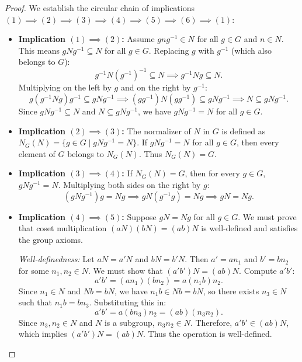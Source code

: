 \begin{proof}
We establish the circular chain of implications $(1) \implies (2) \implies (3) \implies (4) \implies (5) \implies (6) \implies (1)$:
\begin{itemize}[leftmargin=1.5em, itemsep=6pt]
    \item \textbf{Implication $(1) \implies (2)$:}
    Assume $gng^{-1} \in N$ for all $g \in G$ and $n \in N$.
    This means $gNg^{-1} \subseteq N$ for all $g \in G$.
    Replacing $g$ with $g^{-1}$ (which also belongs to $G$):
    \begin{equation*}
    g^{-1}N(g^{-1})^{-1} \subseteq N \implies g^{-1}Ng \subseteq N.
    \end{equation*}
    Multiplying on the left by $g$ and on the right by $g^{-1}$:
    \begin{equation*}
    g(g^{-1}Ng)g^{-1} \subseteq gNg^{-1} \implies (gg^{-1})N(gg^{-1}) \subseteq gNg^{-1} \implies N \subseteq gNg^{-1}.
    \end{equation*}
    Since $gNg^{-1} \subseteq N$ and $N \subseteq gNg^{-1}$, we have $gNg^{-1} = N$ for all $g \in G$.

    \item \textbf{Implication $(2) \implies (3)$:}
    The normalizer of $N$ in $G$ is defined as $N_G(N) = \{ g \in G \mid gNg^{-1} = N \}$.
    If $gNg^{-1} = N$ for all $g \in G$, then every element of $G$ belongs to $N_G(N)$.
    Thus $N_G(N) = G$.

    \item \textbf{Implication $(3) \implies (4)$:}
    If $N_G(N) = G$, then for every $g \in G$, $gNg^{-1} = N$.
    Multiplying both sides on the right by $g$:
    \begin{equation*}
    (gNg^{-1})g = Ng \implies gN(g^{-1}g) = Ng \implies gN = Ng.
    \end{equation*}

    \item \textbf{Implication $(4) \implies (5)$:}
    Suppose $gN = Ng$ for all $g \in G$. We must prove that coset multiplication $(aN)(bN) = (ab)N$ is well-defined and satisfies the group axioms.
    
    \emph{Well-definedness:} Let $aN = a'N$ and $bN = b'N$.
    Then $a' = an_1$ and $b' = bn_2$ for some $n_1, n_2 \in N$.
    We must show that $(a'b')N = (ab)N$.
    Compute $a'b'$:
    \begin{equation*}
    a'b' = (an_1)(bn_2) = a(n_1 b)n_2.
    \end{equation*}
    Since $n_1 \in N$ and $Nb = bN$, we have $n_1 b \in Nb = bN$, so there exists $n_3 \in N$ such that $n_1 b = bn_3$.
    Substituting this in:
    \begin{equation*}
    a'b' = a(bn_3)n_2 = (ab)(n_3 n_2).
    \end{equation*}
    Since $n_3, n_2 \in N$ and $N$ is a subgroup, $n_3 n_2 \in N$.
    Therefore, $a'b' \in (ab)N$, which implies $(a'b')N = (ab)N$.
    Thus the operation is well-defined.
    

\end{itemize}
\end{proof}
